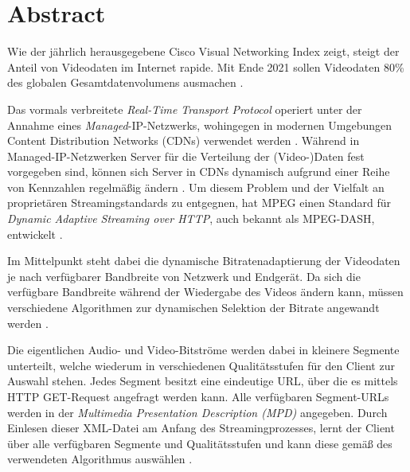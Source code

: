 \documentclass[paper = a4, fontsize = 12pt, parskip = half]{scrartcl} %
\begin{document}


\tableofcontents
\listoffigures
\pagebreak



\setcounter{page}{1}
\onehalfspacing

\section*{Abstract}
Wie der jährlich herausgegebene Cisco Visual Networking Index \cite{cisco_syst_inc_cisco_2017} zeigt, steigt der Anteil von Videodaten im Internet rapide. Mit Ende 2021 sollen Videodaten 80\% des globalen Gesamtdatenvolumens ausmachen \cite{cisco_syst_inc_cisco_2017}.

Das vormals verbreitete \textit{Real-Time Transport Protocol} operiert unter der Annahme eines \textit{Managed}-IP-Netzwerks, wohingegen in modernen Umgebungen Content Distribution Networks (CDNs) verwendet werden \cite{sodagar_mpeg-dash_2011}. Während in Managed-IP-Netzwerken Server für die Verteilung der (Video-)Daten fest vorgegeben sind, können sich Server in CDNs dynamisch aufgrund einer Reihe von Kennzahlen regelmäßig ändern \cite{buyya_content_2008}. Um diesem Problem und der Vielfalt an proprietären Streamingstandards zu entgegnen, hat MPEG einen Standard für \textit{Dynamic Adaptive Streaming over HTTP}, auch bekannt als MPEG-DASH, entwickelt \cite{sodagar_mpeg-dash_2011}.

Im Mittelpunkt steht dabei die dynamische Bitratenadaptierung der Videodaten je nach verfügbarer Bandbreite von Netzwerk und Endgerät. Da sich die verfügbare Bandbreite während der Wiedergabe des Videos ändern kann, müssen verschiedene Algorithmen zur dynamischen Selektion der Bitrate angewandt werden \cite{bentaleb_survey_2019}.

Die eigentlichen Audio- und Video-Bitströme werden dabei in kleinere Segmente unterteilt, welche wiederum in verschiedenen Qualitätsstufen für den Client zur Auswahl stehen. Jedes Segment besitzt eine eindeutige URL, über die es mittels HTTP GET-Request angefragt werden kann. Alle verfügbaren Segment-URLs werden in der \textit{Multimedia Presentation Description (MPD)} angegeben. Durch Einlesen dieser XML-Datei am Anfang des Streamingprozesses, lernt der Client über alle verfügbaren Segmente und Qualitätsstufen und kann diese gemäß des verwendeten Algorithmus auswählen \cite{sodagar_mpeg-dash_2011}.
\end{document}
